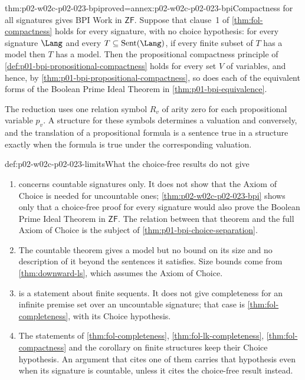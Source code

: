 \begin{hbtheorem}{thm:p02-w02c-p02-023-bpi}{proved=annex:p02-w02c-p02-023-bpi}{Compactness for all signatures gives BPI}
Work in \(\mathsf{ZF}\).  Suppose that clause~1 of \cref{thm:fol-compactness}
holds for every signature, with no choice hypothesis: for every signature
\(\Lang\) and every \(T\subseteq\operatorname{Sent}(\Lang)\), if every finite subset of
\(T\) has a model then \(T\) has a model.  Then the propositional
compactness principle of \cref{def:p01-bpi-propositional-compactness} holds
for every set \(V\) of variables, and hence, by
\cref{thm:p01-bpi-propositional-compactness}, so does each of the
equivalent forms of the Boolean Prime Ideal Theorem in
\cref{thm:p01-bpi-equivalence}.
\end{hbtheorem}

The reduction uses one relation symbol \(R_v\) of arity zero for each
propositional variable \(p_v\).  A structure for these symbols determines a
valuation and conversely, and the translation of a propositional formula is a
sentence true in a structure exactly when the formula is true under the
corresponding valuation.

\begin{hbwarning}{def:p02-w02c-p02-023-limits}{What the choice-free results do not give}
\begin{enumerate}
  \item {} concerns countable
        signatures only.  It does not show that the Axiom of Choice is
        needed for uncountable ones;
        \cref{thm:p02-w02c-p02-023-bpi} shows only that a choice-free proof
        for every signature would also prove the Boolean Prime Ideal Theorem
        in \(\mathsf{ZF}\).  The relation between that theorem and the full
        Axiom of Choice is the subject of
        \cref{thm:p01-bpi-choice-separation}.
  \item The countable theorem gives a model but no bound on its size and no
        description of it beyond the sentences it satisfies.  Size bounds
        come from \cref{thm:downward-ls}, which assumes the Axiom of Choice.
  \item {} is a statement about finite
        sequents.  It does not give completeness for an infinite premise set
        over an uncountable signature; that case is
        \cref{thm:fol-completeness}, with its Choice hypothesis.
  \item The statements of \cref{thm:fol-completeness},
        \cref{thm:fol-lk-completeness}, \cref{thm:fol-compactness} and the
        corollary on finite structures keep their Choice hypothesis.  An
        argument that cites one of them carries that hypothesis even when
        its signature is countable, unless it cites the choice-free result
        instead.
\end{enumerate}
\end{hbwarning}

